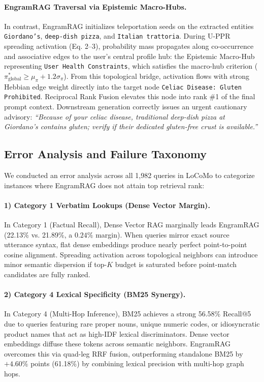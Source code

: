 \documentclass[conference]{IEEEtran}
\begin{document}
\paragraph{EngramRAG Traversal via Epistemic Macro-Hubs.}
In contrast, EngramRAG initializes teleportation seeds on the extracted entities \texttt{Giordano's}, \texttt{deep-dish pizza}, and \texttt{Italian trattoria}. During U-PPR spreading activation (Eq. 2--3), probability mass propagates along co-occurrence and associative edges to the user's central profile hub: the Epistemic Macro-Hub representing \texttt{User Health Constraints}, which satisfies the macro-hub criterion ($\pi^*_{\text{global}} \ge \mu_\pi + 1.2\sigma_\pi$). From this topological bridge, activation flows with strong Hebbian edge weight directly into the target node \texttt{Celiac Disease: Gluten Prohibited}. Reciprocal Rank Fusion elevates this node into rank \#1 of the final prompt context. Downstream generation correctly issues an urgent cautionary advisory: \textit{``Because of your celiac disease, traditional deep-dish pizza at Giordano's contains gluten; verify if their dedicated gluten-free crust is available.''}

\subsection{Error Analysis and Failure Taxonomy}
We conducted an error analysis across all 1,982 queries in LoCoMo to categorize instances where EngramRAG does not attain top retrieval rank:

\paragraph{1) Category 1 Verbatim Lookups (Dense Vector Margin).} In Category 1 (Factual Recall), Dense Vector RAG marginally leads EngramRAG (22.13\% vs. 21.89\%, a $0.24\%$ margin). When queries mirror exact source utterance syntax, flat dense embeddings produce nearly perfect point-to-point cosine alignment. Spreading activation across topological neighbors can introduce minor semantic dispersion if top-$K$ budget is saturated before point-match candidates are fully ranked.

\paragraph{2) Category 4 Lexical Specificity (BM25 Synergy).} In Category 4 (Multi-Hop Inference), BM25 achieves a strong 56.58\% Recall@5 due to queries featuring rare proper nouns, unique numeric codes, or idiosyncratic product names that act as high-IDF lexical discriminators. Dense vector embeddings diffuse these tokens across semantic neighbors. EngramRAG overcomes this via quad-leg RRF fusion, outperforming standalone BM25 by $+4.60\%$ points (61.18\%) by combining lexical precision with multi-hop graph hops.
\end{document}
